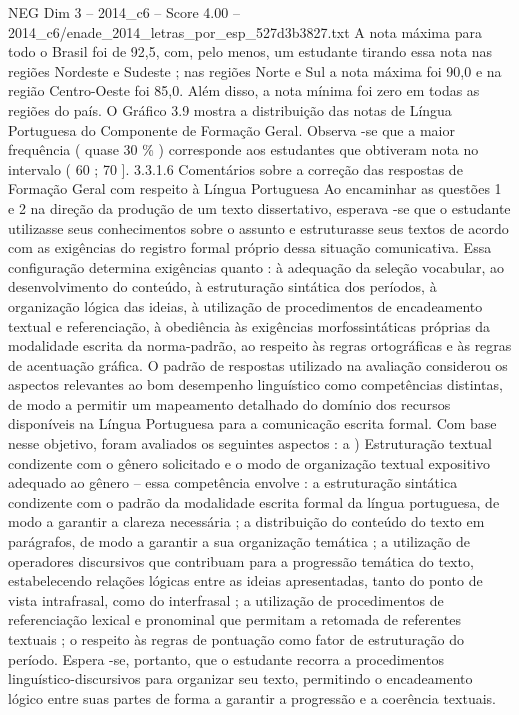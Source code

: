 \begin{textsample}{NEG Dim 3 – 2014\_c6 – Score 4.00 – 2014\_c6/enade\_2014\_letras\_por\_esp\_527d3b3827.txt}
A nota máxima para todo o Brasil foi de 92,5, com, pelo menos, um estudante tirando essa nota nas regiões Nordeste e Sudeste ; nas regiões Norte e Sul a nota máxima foi 90,0 e na região Centro-Oeste foi 85,0.
Além disso, a nota mínima foi zero em todas as regiões do país.
O Gráfico 3.9 mostra a distribuição das notas de Língua Portuguesa do Componente de Formação Geral.
Observa -se que a maior frequência ( quase 30 \% ) corresponde aos estudantes que obtiveram nota no intervalo ( 60 ; 70 ]. 3.3.1.6 Comentários sobre a correção das respostas de Formação Geral com respeito à Língua Portuguesa Ao encaminhar as questões 1 e 2 na direção da produção de um texto dissertativo, esperava -se que o estudante utilizasse seus conhecimentos sobre o assunto e estruturasse seus textos de acordo com as exigências do registro formal próprio dessa situação comunicativa.
Essa configuração determina exigências quanto : à adequação da seleção vocabular, ao desenvolvimento do conteúdo, à estruturação sintática dos períodos, à organização lógica das ideias, à utilização de procedimentos de encadeamento textual e referenciação, à obediência às exigências morfossintáticas próprias da modalidade escrita da norma-padrão, ao respeito às regras ortográficas e às regras de acentuação gráfica.
O padrão de respostas utilizado na avaliação considerou os aspectos relevantes ao bom desempenho linguístico como competências distintas, de modo a permitir um mapeamento detalhado do domínio dos recursos disponíveis na Língua Portuguesa para a comunicação escrita formal.
Com base nesse objetivo, foram avaliados os seguintes aspectos : a ) Estruturação textual condizente com o gênero solicitado e o modo de organização textual expositivo adequado ao gênero – essa competência envolve : a estruturação sintática condizente com o padrão da modalidade escrita formal da língua portuguesa, de modo a garantir a clareza necessária ; a distribuição do conteúdo do texto em parágrafos, de modo a garantir a sua organização temática ; a utilização de operadores discursivos que contribuam para a progressão temática do texto, estabelecendo relações lógicas entre as ideias apresentadas, tanto do ponto de vista intrafrasal, como do interfrasal ; a utilização de procedimentos de referenciação lexical e pronominal que permitam a retomada de referentes textuais ; o respeito às regras de pontuação como fator de estruturação do período.
Espera -se, portanto, que o estudante recorra a procedimentos linguístico-discursivos para organizar seu texto, permitindo o encadeamento lógico entre suas partes de forma a garantir a progressão e a coerência textuais.

\end{textsample}

